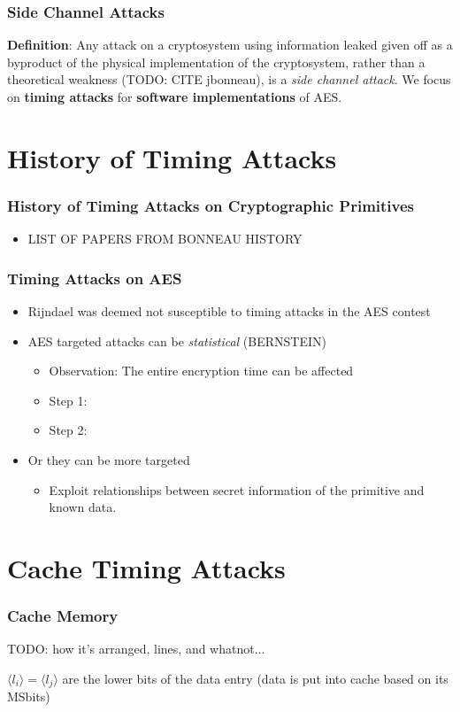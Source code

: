\documentclass[8pt,handout]{beamer}
\begin{document}
\begin{frame}
	\frametitle{Side Channel Attacks}
	\textbf{Definition}: Any attack on a cryptosystem using information leaked given off as a byproduct of the physical implementation of the cryptosystem, rather than a theoretical weakness (TODO: CITE jbonneau), is a \emph{side channel attack}.
	\medskip
	We focus on \textbf{timing attacks} for \textbf{software implementations} of AES.
\end{frame}

\section{History of Timing Attacks}
\begin{frame}
	\frametitle{History of Timing Attacks on Cryptographic Primitives}
	\begin{itemize}
		\item LIST OF PAPERS FROM BONNEAU HISTORY
	\end{itemize}
\end{frame}

\begin{frame}
	\frametitle{Timing Attacks on AES}
	\begin{itemize}
		\item Rijndael was deemed not susceptible to timing attacks in the AES contest
		\item AES targeted attacks can be \emph{statistical} (BERNSTEIN)
		\begin{itemize}
			\item Observation: The entire encryption time can be affected
			\item Step 1: 
			\item Step 2: 
		\end{itemize}
		\item Or they can be more targeted
		\begin{itemize}
			\item Exploit relationships between secret information of the primitive and known data.
		\end{itemize}
	\end{itemize}
\end{frame}

\section{Cache Timing Attacks}
\begin{frame}
	\frametitle{Cache Memory}
	TODO: how it's arranged, lines, and whatnot...

$\langle l_i \rangle = \langle l_j \rangle$ are the lower bits of the data entry (data is put into cache based on its MSbits)
\end{frame}
\end{document}
